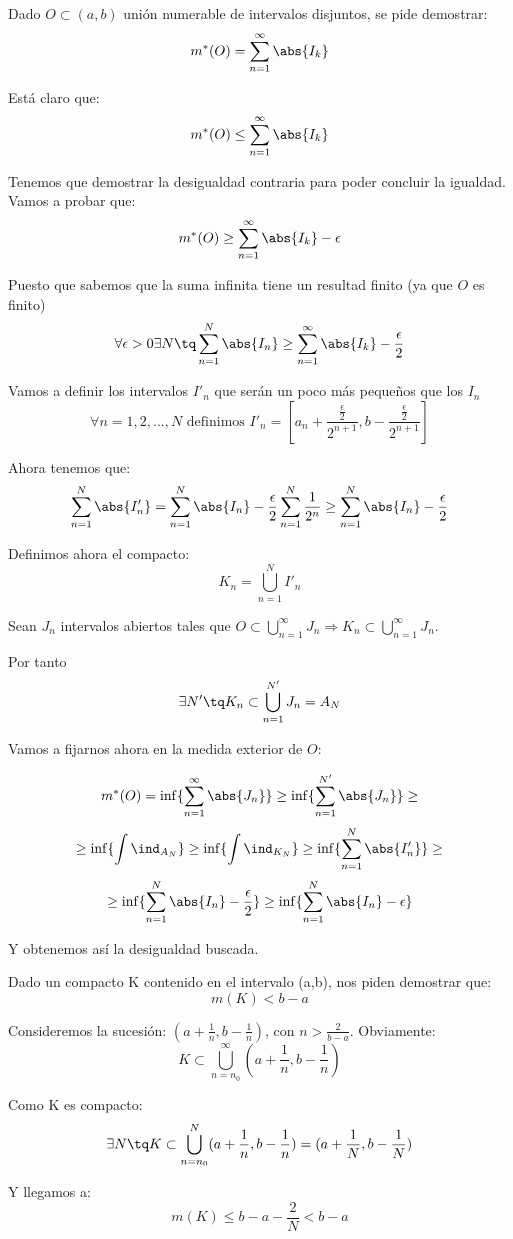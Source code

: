 \begin{problem}[9]
Dado $O\subset (a,b)$ unión numerable de intervalos disjuntos, se pide demostrar:
\[m^*(O)=\sum_{n=1}^{\infty} \abs{I_k}\]

\solution
Está claro que:
\[m^*(O) \leq \sum_{n=1}^{\infty} \abs{I_k}\]

Tenemos que demostrar la desigualdad contraria para poder concluir la igualdad.
Vamos a probar que:
\[m^*(O) \geq \sum_{n=1}^{\infty} \abs{I_k} - \epsilon\]

Puesto que sabemos que la suma infinita tiene un resultad finito (ya que $O$ es finito)
\[\forall \epsilon > 0 \exists N \tq \sum_{n=1}^N\abs{I_n} \geq \sum_{n=1}^{\infty} \abs{I_k} - \frac{\epsilon}{2}\]

Vamos a definir los intervalos $I'_n$ que serán un poco más pequeños que los $I_n$
\[\forall n=1,2,...,N \text{ definimos } I'_n=[a_n+\frac{\frac{\epsilon}{2}}{2^{n+1}}, b-\frac{\frac{\epsilon}{2}}{2^{n+1}}]\]

Ahora tenemos que:
\[\sum_{n=1}^N \abs{I'_n}=\sum_{n=1}^N\abs{I_n} - \frac{\epsilon}{2}\sum_{n=1}^{N}\frac{1}{2^n} \geq \sum_{n=1}^N\abs{I_n} - \frac{\epsilon}{2}\]

Definimos ahora el compacto:
\[K_n = \bigcup_{n=1}^N I'_n\]

Sean $J_n$ intervalos abiertos tales que $O \subset \bigcup_{n=1}^{\infty}J_n \Rightarrow K_n \subset \bigcup_{n=1}^{\infty}J_n$.

Por tanto
\[\exists N' \tq K_n \subset \bigcup_{n=1}^{N'}J_n=A_N\]

Vamos a fijarnos ahora en la medida exterior de $O$:

\[ m^*(O) = \inf\lbrace \sum_{n=1}^{\infty}\abs{J_n} \rbrace \geq \inf\lbrace \sum_{n=1}^{N'}\abs{J_n} \rbrace \geq \]
\[ \geq \inf\lbrace \int \ind_{A_N} \rbrace \geq \inf\lbrace \int \ind_{K_N} \rbrace \geq \inf\lbrace \sum_{n=1}^N\abs{I'_n} \rbrace \geq \]
\[ \geq \inf\lbrace \sum_{n=1}^N\abs{I_n} -\frac{\epsilon}{2}\rbrace \geq \inf\lbrace \sum_{n=1}^N\abs{I_n} -\epsilon \rbrace \]

Y obtenemos así la desigualdad buscada.
\end{problem}

\begin{problem}[10]
Dado un compacto K contenido en el intervalo (a,b), nos piden demostrar que:
\[m(K)<b-a\]

\solution
Consideremos la sucesión: $(a+\frac{1}{n}, b - \frac{1}{n})$, con $n >\frac{2}{b-a}$. Obviamente:
\[K \subset \bigcup_{n=n_0}^{\infty}(a+\frac{1}{n}, b - \frac{1}{n})\]

Como K es compacto:
\[\exists N \tq K \subset \bigcup_{n=n_0}^{N}(a+\frac{1}{n}, b - \frac{1}{n}) = (a+\frac{1}{N}, b - \frac{1}{N}) \]

Y llegamos a:
\[m(K) \leq b-a-\frac{2}{N} < b-a\]

\end{problem}

